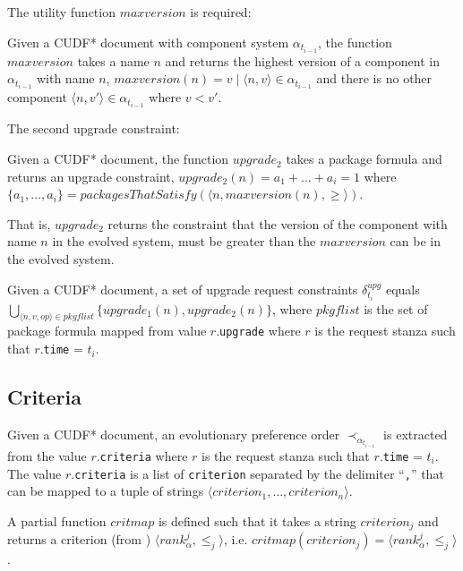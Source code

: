 The utility function $maxversion$ is required:
\begin{defs}
Given a CUDF* document with component system $\alpha_{t_{i-1}}$, the function $maxversion$ takes a name $n$ and returns the highest version of a component in $\alpha_{t_{i-1}}$ with name $n$,
$maxversion(n) = v  \mid \langle n,v \rangle \in \alpha_{t_{i-1}}$ and there is no other component $\langle n,v' \rangle \in \alpha_{t_{i-1}}$ where $v < v'$.
\end{defs}

The second upgrade constraint:
\begin{defs}
Given a CUDF* document, the function $upgrade_2$ takes a package formula and returns an upgrade constraint,
$upgrade_2(n) = a_1 + \ldots + a_i = 1$ where $\{a_1,\ldots,a_i\} = packagesThatSatisfy(\langle n,maxversion(n),\geq\rangle)$. 
\end{defs}
That is, $upgrade_2$ returns the constraint that the version of the component with name $n$ in the evolved system, must be greater than the $maxversion$ can be in the evolved system.

\begin{defs}
Given a CUDF* document, a set of upgrade request constraints $\delta_{t_i}^{upg}$ equals $\bigcup \limits_{\langle n,v,op \rangle \in pkgflist} \{upgrade_1(n),upgrade_2(n)\}$, 
where $pkgflist$ is the set of package formula mapped from value $r$.\texttt{upgrade} where $r$ is the request stanza such that $r$.\texttt{time} = $t_i$.
\end{defs}

\subsection{Criteria}
Given a CUDF* document, an evolutionary preference order $\prec_{\alpha_{t_{i-1}}}$ is extracted from the value $r$.\texttt{criteria} where $r$ is the request stanza such that $r$.\texttt{time} = $t_i$.
The value $r$.\texttt{criteria} is a list of \verb+criterion+ separated by the delimiter ``\verb+,+'' that can be mapped to a tuple of strings $\langle criterion_1, \ldots, criterion_n \rangle$.

\begin{defs}
A partial function $critmap$ is defined such that it takes a string $criterion_j$ and returns a criterion (from \modelname) $\langle rank^j_{\alpha}, \leq_j \rangle$, 
i.e. $critmap(criterion_j) = \langle rank^j_{\alpha}, \leq_j \rangle$.
\end{defs} 

